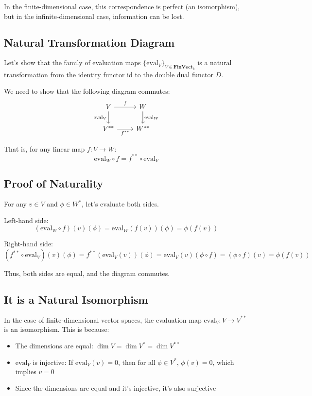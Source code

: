 \documentclass[uplatex,a4j,12pt,dvipdfmx]{jsarticle}
\begin{document}
In the finite-dimensional case, this correspondence is perfect (an isomorphism), but in the infinite-dimensional case, information can be lost.





\subsection{Natural Transformation Diagram}

Let's show that the family of evaluation maps $\{\mathrm{eval}_V\}_{V \in \mathbf{FinVect}_k}$ is a natural transformation from the identity functor $\mathrm{id}$ to the double dual functor $D$.

We need to show that the following diagram commutes:
\[
	\begin{tikzcd}
		V \arrow[r, "f"] \arrow[d, "\mathrm{eval}_V"']
		& W \arrow[d, "\mathrm{eval}_W"] \\
		V^{**} \arrow[r, "f^{**}"']
		& W^{**}
	\end{tikzcd}
\]

That is, for any linear map $f: V \to W$:
\[
	\mathrm{eval}_W \circ f = f^{**} \circ \mathrm{eval}_V
\]

\subsection{Proof of Naturality}

For any $v \in V$ and $\phi \in W^*$, let's evaluate both sides.

Left-hand side:
\[
	(\mathrm{eval}_W \circ f)(v)(\phi) = \mathrm{eval}_W(f(v))(\phi) = \phi(f(v))
\]

Right-hand side:
\[
	(f^{**} \circ \mathrm{eval}_V)(v)(\phi) = f^{**}(\mathrm{eval}_V(v))(\phi)
	= \mathrm{eval}_V(v)(\phi \circ f) = (\phi \circ f)(v) = \phi(f(v))
\]

Thus, both sides are equal, and the diagram commutes.

\subsection{It is a Natural Isomorphism}

In the case of finite-dimensional vector spaces, the evaluation map $\mathrm{eval}_V: V \to V^{**}$ is an isomorphism.
This is because:
\begin{itemize}
	\item The dimensions are equal: $\dim V = \dim V^* = \dim V^{**}$
	\item $\mathrm{eval}_V$ is injective: If $\mathrm{eval}_V(v) = 0$, then for all $\phi \in V^*$, $\phi(v) = 0$, which implies $v = 0$
	\item Since the dimensions are equal and it's injective, it's also surjective
\end{itemize}
\end{document}
